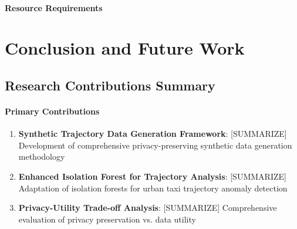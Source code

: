 \documentclass[runningheads]{llncs}
\begin{document}
\paragraph{Resource Requirements}


\section{Conclusion and Future Work}
\label{sec:conclusion}


\subsection{Research Contributions Summary}

\paragraph{Primary Contributions}
\begin{enumerate}
\item \textbf{Synthetic Trajectory Data Generation Framework}: [SUMMARIZE] Development of comprehensive privacy-preserving synthetic data generation methodology

\item \textbf{Enhanced Isolation Forest for Trajectory Analysis}: [SUMMARIZE] Adaptation of isolation forests for urban taxi trajectory anomaly detection

\item \textbf{Privacy-Utility Trade-off Analysis}: [SUMMARIZE] Comprehensive evaluation of privacy preservation vs. data utility
\end{enumerate}
\end{document}

